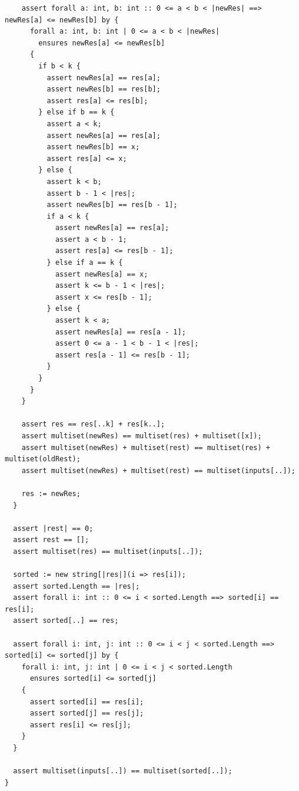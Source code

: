 \documentclass{article}
\begin{document}
\begin{lstlisting}
    assert forall a: int, b: int :: 0 <= a < b < |newRes| ==> newRes[a] <= newRes[b] by {
      forall a: int, b: int | 0 <= a < b < |newRes|
        ensures newRes[a] <= newRes[b]
      {
        if b < k {
          assert newRes[a] == res[a];
          assert newRes[b] == res[b];
          assert res[a] <= res[b];
        } else if b == k {
          assert a < k;
          assert newRes[a] == res[a];
          assert newRes[b] == x;
          assert res[a] <= x;
        } else {
          assert k < b;
          assert b - 1 < |res|;
          assert newRes[b] == res[b - 1];
          if a < k {
            assert newRes[a] == res[a];
            assert a < b - 1;
            assert res[a] <= res[b - 1];
          } else if a == k {
            assert newRes[a] == x;
            assert k <= b - 1 < |res|;
            assert x <= res[b - 1];
          } else {
            assert k < a;
            assert newRes[a] == res[a - 1];
            assert 0 <= a - 1 < b - 1 < |res|;
            assert res[a - 1] <= res[b - 1];
          }
        }
      }
    }

    assert res == res[..k] + res[k..];
    assert multiset(newRes) == multiset(res) + multiset([x]);
    assert multiset(newRes) + multiset(rest) == multiset(res) + multiset(oldRest);
    assert multiset(newRes) + multiset(rest) == multiset(inputs[..]);

    res := newRes;
  }

  assert |rest| == 0;
  assert rest == [];
  assert multiset(res) == multiset(inputs[..]);

  sorted := new string[|res|](i => res[i]);
  assert sorted.Length == |res|;
  assert forall i: int :: 0 <= i < sorted.Length ==> sorted[i] == res[i];
  assert sorted[..] == res;

  assert forall i: int, j: int :: 0 <= i < j < sorted.Length ==> sorted[i] <= sorted[j] by {
    forall i: int, j: int | 0 <= i < j < sorted.Length
      ensures sorted[i] <= sorted[j]
    {
      assert sorted[i] == res[i];
      assert sorted[j] == res[j];
      assert res[i] <= res[j];
    }
  }

  assert multiset(inputs[..]) == multiset(sorted[..]);
}
\end{lstlisting}
\end{document}
